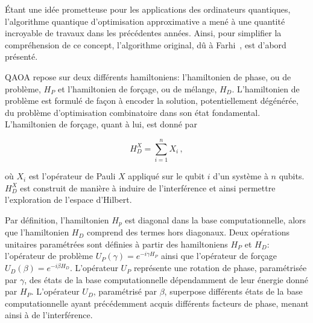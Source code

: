 Étant une idée prometteuse pour les applications des ordinateurs quantiques, l'algorithme quantique d'optimisation approximative a mené à une quantité incroyable de travaux dans les précédentes années. Ainsi, pour simplifier la compréhension de ce concept, l'algorithme original, dû à Farhi~\cite{farhiQuantumApproximateOptimization2014}, est d'abord présenté.

QAOA repose sur deux différents hamiltoniens: l'hamiltonien de phase, ou de problème, $H_{P}$ et l'hamiltonien de forçage, ou de mélange, $H_{D}$. L'hamiltonien de problème est formulé de façon à encoder la solution, potentiellement dégénérée, du problème d'optimisation combinatoire dans son état fondamental. L'hamiltonien de forçage, quant à lui, est donné par

\begin{equation}
    \label{eq:x-drive}
    H_{D}^{X} = \sum_{i=1}^{n} X_{i} \,,
\end{equation}

où $X_{i}$ est l'opérateur de Pauli $X$ appliqué sur le qubit $i$ d'un système à $n$ qubits. $H_{D}^{X}$ est construit de manière à induire de l'interférence et ainsi permettre l'exploration de l'espace d'Hilbert. 

Par définition, l'hamiltonien $H_{p}$ est diagonal dans la base computationnelle, alors que l'hamiltonien $H_{D}$ comprend des termes hors diagonaux. Deux opérations unitaires paramétrées sont définies à partir des hamiltoniens $H_{P}$ et $H_{D}$: l'opérateur de problème $U_{P}(\gamma) = e^{-i \gamma H_{P}}$ ainsi que l'opérateur de forçage $U_{D}(\beta) = e^{-i \beta H_{D}}$. L'opérateur $U_{P}$ représente une rotation de phase, paramétrisée par $\gamma$, des états de la base computationnelle dépendamment de leur énergie donné par $H_{P}$. L'opérateur $U_{D}$, paramétrisé par $\beta$, superpose différents états de la base computationnelle ayant précédemment acquis différents facteurs de phase, menant ainsi à de l'interférence.

